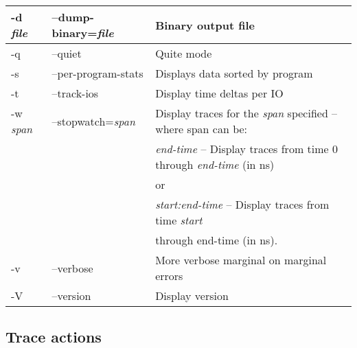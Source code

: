 \documentclass{article}
\begin{document}
\begin{tabular}{|l|l|l|}
-d \emph{file}     & --dump-binary=\emph{file}  & Binary output file \\ \hline

-q                 & --quiet                    & Quite mode \\ \hline

-s                 & --per-program-stats        & Displays data sorted by program \\ \hline

-t                 & --track-ios                & Display time deltas per IO \\ \hline

-w \emph{span}     & --stopwatch=\emph{span}    & Display traces for the \emph{span} specified -- where span can be: \\ 
                   &                            & \emph{end-time} -- Display traces from time 0 through \emph{end-time} (in ns) \\
		   &                            & or \\
		   &                            & \emph{start:end-time} -- Display traces from time \emph{start} \\
		   &                            & through {end-time} (in ns). \\ \hline

-v                 & --verbose                  & More verbose marginal on marginal errors \\ \hline
-V                 & --version                  & Display version \\ \hline

\end{tabular}

\newpage
\subsection{\label{sec:blkparse-actions}Trace actions}
\end{document}
